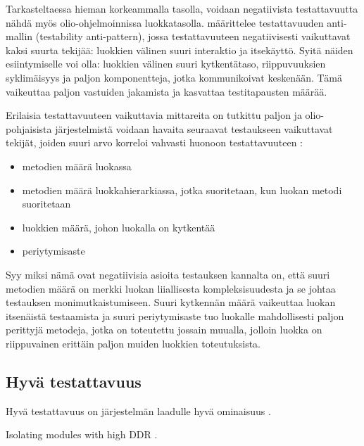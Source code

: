 \documentclass[finnish]{tktltiki2}
\theoremstyle{definition}
\theoremstyle{remark}
\begin{document}
Tarkasteltaessa hieman korkeammalla tasolla, voidaan negatiivista testattavuutta nähdä myös olio-ohjelmoinnissa luokkatasolla. \citep[s. 3]{baudry_measuring_2003} määrittelee testattavuuden anti-mallin (testability anti-pattern), jossa testattavuuteen negatiivisesti vaikuttavat kaksi suurta tekijää: luokkien välinen suuri interaktio ja itsekäyttö. Syitä näiden esiintymiselle voi olla: luokkien välinen suuri kytkentätaso, riippuvuuksien syklimäisyys ja paljon komponentteja, jotka kommunikoivat keskenään. Tämä vaikeuttaa paljon vastuiden jakamista ja kasvattaa testitapausten määrää. 


Erilaisia testattavuuteen vaikuttavia mittareita on tutkittu paljon ja olio-pohjaisista järjestelmistä voidaan havaita seuraavat testaukseen vaikuttavat tekijät, joiden suuri arvo korreloi vahvasti huonoon testattavuuteen \citep[s. 5]{Dubey:2011:AMM:2020976.2020983}:

\begin{itemize}
	\item metodien määrä luokassa
	\item metodien määrä luokkahierarkiassa, jotka suoritetaan, kun luokan metodi suoritetaan
	\item luokkien määrä, johon luokalla on kytkentää
	\item periytymisaste
\end{itemize}

Syy miksi nämä ovat negatiivisia asioita testauksen kannalta on, että suuri metodien määrä on merkki luokan liiallisesta kompleksisuudesta ja se johtaa testauksen monimutkaistumiseen. Suuri kytkennän määrä vaikeuttaa luokan itsenäistä testaamista ja suuri periytymisaste tuo luokalle mahdollisesti paljon perittyjä metodeja, jotka on toteutettu jossain muualla, jolloin luokka on riippuvainen erittäin paljon muiden luokkien toteutuksista. 


\subsection{Hyvä testattavuus}



Hyvä testattavuus on järjestelmän laadulle hyvä ominaisuus \citep[s. 20]{Voas:1995:STN:624607.625469}. 

Isolating modules with high DDR \citep[s. 23]{Voas:1995:STN:624607.625469}.
\end{document}
